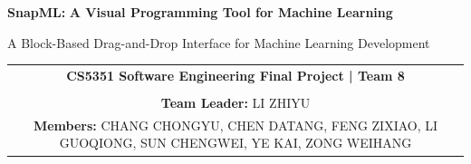 \documentclass[a0paper,portrait]{article}
\begin{document}
\begin{center}
\textcolor{headercol}{\fontsize{40}{48}\selectfont\textbf{SnapML:}} \fontsize{40}{48}\selectfont\textbf{A Visual Programming Tool for Machine Learning}

\vspace{0.5cm}
{\LARGE A Block-Based Drag-and-Drop Interface for Machine Learning Development}

\vspace{1cm}
\begin{tabular}{c}
    \textbf{CS5351 Software Engineering Final Project | Team 8}\\
    \vspace{0.5cm}\\
    \textbf{Team Leader:} LI ZHIYU \\
    \textbf{Members:} CHANG CHONGYU, CHEN DATANG, FENG ZIXIAO, LI GUOQIONG, SUN CHENGWEI, YE KAI, ZONG WEIHANG
\end{tabular}
\end{center}
\end{document}
